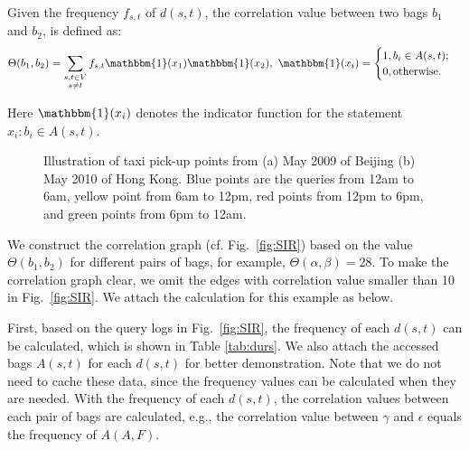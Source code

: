 \begin{defi}
	Given the frequency $f_{s,t}$ of $d(s,t)$, the correlation value between two bags $b_1$ and $b_2$, is defined as:
	\begin{equation}
	\Theta(b_1,b_2)=\sum\limits_{\substack{s,t\in V \\ s\neq t}}f_{s,t} \mathbbm{1}(x_1) \mathbbm{1}(x_2),\ 	\mathbbm{1}(x_i) =\begin{cases}
	1,b_i\in A(s,t); \\
	0,\text{otherwise.}
	\end{cases}
	\end{equation}
\end{defi}
Here $\mathbbm{1}(x_i)$ denotes the indicator function for the statement $x_i: b_i\in A(s,t)$. 
\begin{figure}[!t] {
		\npart
		\caption{Illustration of taxi pick-up points from (a) May 2009 of Beijing (b) May 2010 of Hong Kong. Blue points are the queries from 12am to 6am, yellow point from 6am to 12pm, red points from 12pm to 6pm, and green points from 6pm to 12am.}
		\label{fig:query}
	}
\end{figure}
We construct the correlation graph (cf. Fig.~\ref{fig:SIR}) based on the value $\Theta(b_1,b_2)$ for different pairs of bags, for example, $\Theta(\alpha,\beta)=28$. To make the correlation graph clear, we omit the edges with correlation value smaller than 10 in Fig.~\ref{fig:SIR}. 
We attach the calculation for this example as below.



First, based on the query logs in Fig.~\ref{fig:SIR}, the frequency of each $d(s,t)$ can be calculated, which is shown in Table \ref{tab:durs}. We also attach the accessed bags $A(s,t)$ for each $d(s,t)$ for better demonstration. 
Note that we do not need to cache these data, since the frequency values can be calculated when they are needed. 
With the frequency of each $d(s,t)$, the correlation values between each pair of bags are calculated, e.g., the correlation value between $\gamma$ and $\epsilon$ equals the frequency of $A(A,F)$.

